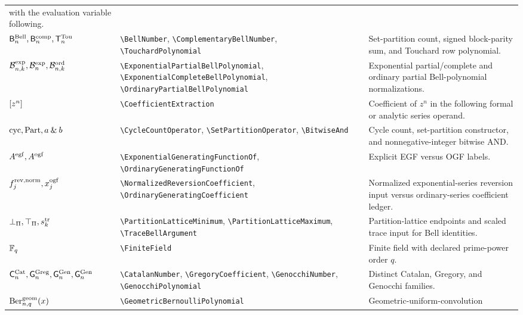 \documentclass[11pt,oneside]{article}
\theoremstyle{definition}
\theoremstyle{remark}
\DeclareRobustCommand{\commandname}[1]{\texttt{\textbackslash#1}}
\begin{document}
\begin{longtable}{@{}L{0.22\textwidth}S{0.38\textwidth}L{0.34\textwidth}@{}}
with the evaluation variable following.\\
\(\mathsf{B}^{\mathrm{Bell}}_{n},\mathsf{B}^{\mathrm{comp}}_{n},\mathsf{T}^{\mathrm{Tou}}_{n}\) &
\commandname{BellNumber}, \commandname{ComplementaryBellNumber},
\commandname{TouchardPolynomial} & Set-partition count, signed block-parity
sum, and Touchard row polynomial.\\
\(\mathcal{B}^{\mathrm{exp}}_{n,k},
  \mathcal{B}^{\mathrm{exp}}_{n},
  \mathcal{B}^{\mathrm{ord}}_{n,k}\) &
\commandname{ExponentialPartialBellPolynomial},
\commandname{ExponentialCompleteBellPolynomial},
\commandname{OrdinaryPartialBellPolynomial} & Exponential partial/complete and
ordinary partial Bell-polynomial normalizations.\\
\(\left[z^{n}\right]\) & \commandname{CoefficientExtraction} &
Coefficient of \(z^n\) in the following formal or analytic series operand.\\
\(\operatorname{cyc},\operatorname{Part},a\mathbin{\&} b\) &
\commandname{CycleCountOperator}, \commandname{SetPartitionOperator},
\commandname{BitwiseAnd} & Cycle count, set-partition constructor, and
nonnegative-integer bitwise AND.\\
\(A^{\mathrm{egf}},A^{\mathrm{ogf}}\) &
\commandname{ExponentialGeneratingFunctionOf},
\commandname{OrdinaryGeneratingFunctionOf} & Explicit EGF versus OGF labels.\\
\(f^{\mathrm{rev,norm}}_{j},
  x^{\mathrm{ogf}}_{j}\) &
\commandname{NormalizedReversionCoefficient},
\commandname{OrdinaryGeneratingCoefficient} & Normalized exponential-series
reversion input versus ordinary-series coefficient ledger.\\
\(\bot_{\Pi},\top_{\Pi},s^{\mathrm{tr}}_{k}\) &
\commandname{PartitionLatticeMinimum}, \commandname{PartitionLatticeMaximum},
\commandname{TraceBellArgument} & Partition-lattice endpoints and scaled trace
input for Bell identities.\\
\(\mathbb{F}_q\) & \commandname{FiniteField} & Finite field with declared
prime-power order \(q\).\\
\(\mathsf{C}^{\mathrm{Cat}}_{n},\mathsf{G}^{\mathrm{Greg}}_{n},
  \mathsf{G}^{\mathrm{Gen}}_{n},\mathsf{G}^{\mathrm{Gen}}_{n}\) &
\commandname{CatalanNumber}, \commandname{GregoryCoefficient},
\commandname{GenocchiNumber}, \commandname{GenocchiPolynomial} & Distinct
Catalan, Gregory, and Genocchi families.\\
\(\mathrm{Ber}^{\mathrm{geom}}_{n,q}(x)\) &
\commandname{GeometricBernoulliPolynomial} & Geometric-uniform-convolution

\end{longtable}
\end{document}
